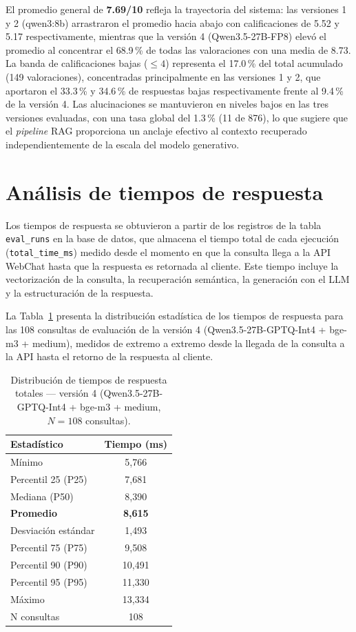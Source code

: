 El promedio general de \textbf{7.69/10} refleja la trayectoria del sistema: las versiones 1 y 2 (qwen3:8b) arrastraron el promedio hacia abajo con calificaciones de 5.52 y 5.17 respectivamente, mientras que la versión 4 (Qwen3.5-27B-FP8) elevó el promedio al concentrar el 68.9\,\% de todas las valoraciones con una media de 8.73. La banda de calificaciones bajas ($\leq 4$) representa el 17.0\,\% del total acumulado (149 valoraciones), concentradas principalmente en las versiones 1 y 2, que aportaron el 33.3\,\% y 34.6\,\% de respuestas bajas respectivamente frente al 9.4\,\% de la versión 4. Las alucinaciones se mantuvieron en niveles bajos en las tres versiones evaluadas, con una tasa global del 1.3\,\% (11 de 876), lo que sugiere que el \textit{pipeline} RAG proporciona un anclaje efectivo al contexto recuperado independientemente de la escala del modelo generativo.

\section{Análisis de tiempos de respuesta}\label{sec:tiempos}

Los tiempos de respuesta se obtuvieron a partir de los registros de la tabla \texttt{eval\_runs} en la base de datos, que almacena el tiempo total de cada ejecución (\texttt{total\_time\_ms}) medido desde el momento en que la consulta llega a la API WebChat hasta que la respuesta es retornada al cliente. Este tiempo incluye la vectorización de la consulta, la recuperación semántica, la generación con el LLM y la estructuración de la respuesta.

La Tabla~\ref{tab:tiempos} presenta la distribución estadística de los tiempos de respuesta para las 108 consultas de evaluación de la versión 4 (Qwen3.5-27B-GPTQ-Int4 + bge-m3 + medium), medidos de extremo a extremo desde la llegada de la consulta a la API hasta el retorno de la respuesta al cliente.

\begin{table}[H]
\centering
\begin{tabular}{|l|c|}
\hline
\textbf{Estadístico} & \textbf{Tiempo (ms)} \\
\hline
Mínimo               & 5{,}766 \\
Percentil 25 (P25)   & 7{,}681 \\
Mediana (P50)        & 8{,}390 \\
\textbf{Promedio}    & \textbf{8{,}615} \\
Desviación estándar  & 1{,}493 \\
Percentil 75 (P75)   & 9{,}508 \\
Percentil 90 (P90)   & 10{,}491 \\
Percentil 95 (P95)   & 11{,}330 \\
Máximo               & 13{,}334 \\
\hline
N consultas & 108 \\
\hline
\end{tabular}
\caption{Distribución de tiempos de respuesta totales — versión 4 (Qwen3.5-27B-GPTQ-Int4 + bge-m3 + medium, $N = 108$ consultas).}
\label{tab:tiempos}
\end{table}


